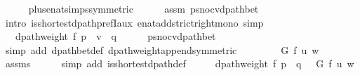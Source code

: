 \begin{isabellebody}
\ \ \ \ \isamarkupfalse%
\ plus{\isacharunderscore}{\kern0pt}enat{\isacharunderscore}{\kern0pt}simps{\isacharbrackleft}{\kern0pt}symmetric{\isacharbrackright}{\kern0pt}\isanewline
\ \ \ \ \isamarkupfalse%
\ assm\ p{\isacharunderscore}{\kern0pt}snoc{\isacharunderscore}{\kern0pt}v{\isacharunderscore}{\kern0pt}dpath{\isacharunderscore}{\kern0pt}bet\isanewline
\ \ \ \ \isamarkupfalse%
\ {\isacharparenleft}{\kern0pt}intro\ is{\isacharunderscore}{\kern0pt}shortest{\isacharunderscore}{\kern0pt}dpath{\isacharunderscore}{\kern0pt}prefI{\isacharunderscore}{\kern0pt}aux\ enat{\isacharunderscore}{\kern0pt}add{\isacharunderscore}{\kern0pt}strict{\isacharunderscore}{\kern0pt}right{\isacharunderscore}{\kern0pt}mono{\isacharparenright}{\kern0pt}\ simp{\isacharplus}{\kern0pt}\isanewline
\ \ \isamarkupfalse%
\ \isamarkupfalse%
\ {\isachardoublequoteopen}{\isachardot}{\kern0pt}{\isachardot}{\kern0pt}{\isachardot}{\kern0pt}\ {\isacharequal}{\kern0pt}\ dpath{\isacharunderscore}{\kern0pt}weight\ f\ {\isacharparenleft}{\kern0pt}p\ {\isacharat}{\kern0pt}\ {\isacharbrackleft}{\kern0pt}v{\isacharbrackright}{\kern0pt}\ {\isacharat}{\kern0pt}\ q{\isacharparenright}{\kern0pt}{\isachardoublequoteclose}\isanewline
\ \ \ \ \isamarkupfalse%
\ p{\isacharunderscore}{\kern0pt}snoc{\isacharunderscore}{\kern0pt}v{\isacharunderscore}{\kern0pt}dpath{\isacharunderscore}{\kern0pt}bet\isanewline
\ \ \ \ \isamarkupfalse%
\ {\isacharparenleft}{\kern0pt}simp\ add{\isacharcolon}{\kern0pt}\ dpath{\isacharunderscore}{\kern0pt}bet{\isacharunderscore}{\kern0pt}def\ dpath{\isacharunderscore}{\kern0pt}weight{\isacharunderscore}{\kern0pt}append{\isacharunderscore}{\kern0pt}{}{\isacharbrackleft}{\kern0pt}symmetric{\isacharbrackright}{\kern0pt}{\isacharparenright}{\kern0pt}\isanewline
\ \ \isamarkupfalse%
\ \isamarkupfalse%
\ {\isachardoublequoteopen}{\isachardot}{\kern0pt}{\isachardot}{\kern0pt}{\isachardot}{\kern0pt}\ {\isacharequal}{\kern0pt}\ {\isasymdelta}\ G\ f\ u\ w{\isachardoublequoteclose}\isanewline
\ \ \ \ \isamarkupfalse%
\ assms\isanewline
\ \ \ \ \isamarkupfalse%
\ {\isacharparenleft}{\kern0pt}simp\ add{\isacharcolon}{\kern0pt}\ is{\isacharunderscore}{\kern0pt}shortest{\isacharunderscore}{\kern0pt}dpath{\isacharunderscore}{\kern0pt}def{\isacharparenright}{\kern0pt}\isanewline
\ \ \isamarkupfalse%
\ \isamarkupfalse%
\ {\isachardoublequoteopen}dpath{\isacharunderscore}{\kern0pt}weight\ f\ {\isacharparenleft}{\kern0pt}p{\isacharprime}{\kern0pt}\ {\isacharat}{\kern0pt}\ q{\isacharparenright}{\kern0pt}\ {\isacharless}{\kern0pt}\ {\isasymdelta}\ G\ f\ u\ w{\isachardoublequoteclose}\isanewline

\end{isabellebody}
